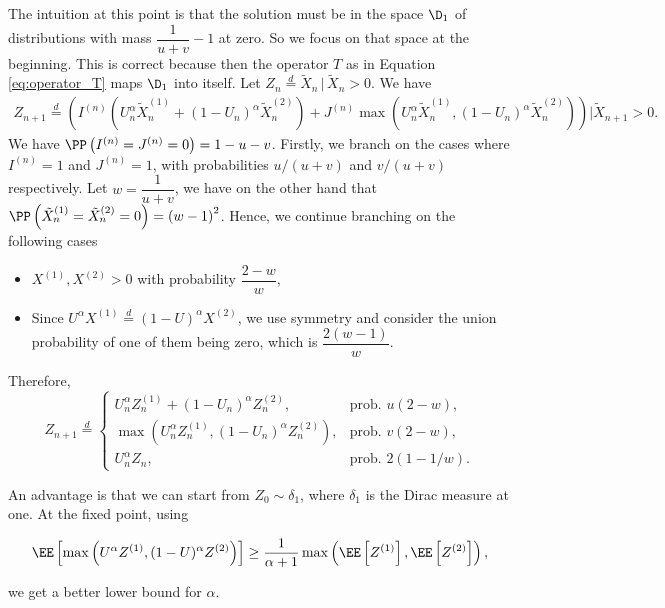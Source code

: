 The intuition at this point is that the solution must be in the space $\D_1$ of distributions with mass $\dfrac{1}{u+v}-1$ at zero. So we focus on that space at the beginning. This is correct because then the operator $T$ as in Equation \eqref{eq:operator_T} maps $\D_1$ into itself. Let $Z_n \stackrel{d}{=} \tilde{X}_n \,|\, \tilde{X}_n > 0$. We have
\begin{align*}
  Z_{n+1}\stackrel{d}{=} \left(I^{(n)}\left(U_n^\alpha \tilde{X}_{n}^{(1)} + (1-U_n)^\alpha \tilde{X}_{n}^{(2)}\right) + J^{(n)}\max\left(U_n^\alpha \tilde{X}_{n}^{(1)}, (1-U_n)^\alpha \tilde{X}_{n}^{(2)}\right)\right) \Big| \tilde{X}_{n+1} > 0.
\end{align*}
We have $\PP\left(I^{(n)}=J^{(n)}=0\right)=1-u-v$. Firstly, we branch on the cases where $I^{(n)}=1$ and $J^{(n)}=1$, with probabilities $u/(u+v)$ and $v/(u+v)$ respectively. Let $w = \dfrac{1}{u+v}$, we have on the other hand that $\PP\left(\tilde{X}_{n}^{(1)} = \tilde{X}_{n}^{(2)} = 0\right) = \left(w-1\right)^2$. Hence, we continue branching on the following cases
\begin{itemize}
  \item $X^{(1)}, X^{(2)}> 0$ with probability $\dfrac{2-w}{w}$,
  \item Since $U^\alpha X^{(1)} \stackrel{d}{=} (1-U)^\alpha X^{(2)}$, we use symmetry and consider the union probability of one of them being zero, which is $\dfrac{2(w-1)}{w}$.
\end{itemize}
Therefore,
\begin{equation}
  Z_{n+1} \stackrel{d}{=}
  \begin{cases}
    U_n^\alpha Z_{n}^{(1)} + (1-U_n)^\alpha Z_{n}^{(2)},
     & \text{prob. } u(2-w),   \\
    \max\left(U_n^\alpha Z_{n}^{(1)}, (1-U_n)^\alpha Z_{n}^{(2)}\right),
     & \text{prob. } v(2-w),   \\
    U_n^\alpha Z_{n},
     & \text{prob. } 2(1-1/w).
  \end{cases}
\end{equation}

An advantage is that we can start from $Z_0\sim\delta_1$, where $\delta_1$ is the Dirac measure at one. At the fixed point, using

$$\EE\left[\max\left(U^\alpha Z^{(1)}, (1-U)^\alpha Z^{(2)}\right)\right] \ge \dfrac{1}{\alpha+1}\max\left(\EE\left[Z^{(1)}\right], \EE\left[Z^{(2)}\right]\right),$$

we get a better lower bound for $\alpha$.

